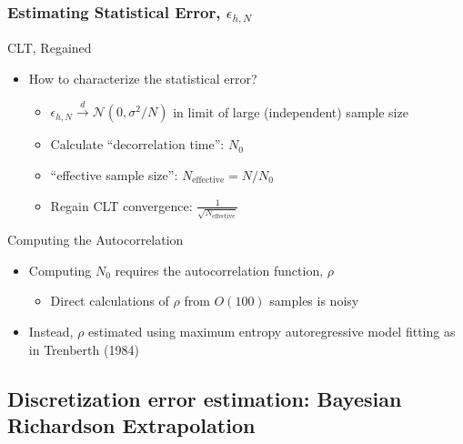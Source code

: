 \documentclass[mathserif]{beamer}
\newcommand{\mcal}[1]{\mathcal{#1}} %
\newcommand{\rarrow}{\rightarrow}
\begin{document}
\begin{frame}
\frametitle{Estimating Statistical Error, $\epsilon_{h,N}$}

 \begin{block}{CLT, Regained}
  \begin{itemize}
  \item How to characterize the statistical error?
	\begin{itemize}	   
	 \item $\epsilon_{h,N} \overset{d}{\rarrow} \mcal{N}(0, \sigma^2/N)$
	       in limit of large (independent) sample size
	 \item Calculate ``decorrelation time'': $N_0$
	 \item ``effective sample size'': $N_\text{effective} = N / N_0$
	 \item Regain CLT convergence:
	       $\frac{1}{\sqrt{N_\text{effective}}}$ 
	\end{itemize}
  \end{itemize}
 \end{block}

 \begin{block}{Computing the Autocorrelation}
   \begin{itemize}	
    \item Computing $N_0$ requires the
	  autocorrelation function, $\rho$
	  \begin{itemize}
	   \item Direct calculations of $\rho$ from $O(100)$ samples is noisy
	  \end{itemize}
    \item Instead, $\rho$ estimated using maximum entropy
	  autoregressive model fitting as in Trenberth (1984)
   \end{itemize}
 \end{block}

\end{frame}


\subsection{Discretization error estimation: Bayesian Richardson Extrapolation}
\end{document}
